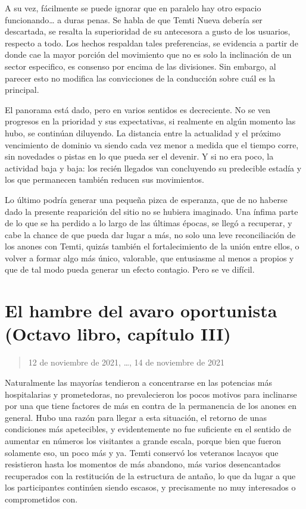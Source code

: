\documentclass[
]{book}
\begin{document}
A su vez, fácilmente se puede ignorar que en paralelo hay otro espacio funcionando\ldots{} a duras penas. Se habla de que Temti Nueva debería ser descartada, se resalta la superioridad de su antecesora a gusto de los usuarios, respecto a todo. Los hechos respaldan tales preferencias, se evidencia a partir de donde cae la mayor porción del movimiento que no es solo la inclinación de un sector especifico, es consenso por encima de las divisiones. Sin embargo, al parecer esto no modifica las convicciones de la conducción sobre cuál es la principal.

El panorama está dado, pero en varios sentidos es decreciente. No se ven progresos en la prioridad y sus expectativas, si realmente en algún momento las hubo, se continúan diluyendo. La distancia entre la actualidad y el próximo vencimiento de dominio va siendo cada vez menor a medida que el tiempo corre, sin novedades o pistas en lo que pueda ser el devenir. Y si no era poco, la actividad baja y baja: los recién llegados van concluyendo su predecible estadía y los que permanecen también reducen sus movimientos.

Lo último podría generar una pequeña pizca de esperanza, que de no haberse dado la presente reaparición del sitio no se hubiera imaginado. Una ínfima parte de lo que se ha perdido a lo largo de las últimas épocas, se llegó a recuperar, y cabe la chance de que pueda dar lugar a más, no solo una leve reconciliación de los anones con Temti, quizás también el fortalecimiento de la unión entre ellos, o volver a formar algo más único, valorable, que entusiasme al menos a propios y que de tal modo pueda generar un efecto contagio. Pero se ve difícil.

\hypertarget{el-hambre-del-avaro-oportunista-octavo-libro-capuxedtulo-iii}{%
\section{El hambre del avaro oportunista (Octavo libro, capítulo III)}\label{el-hambre-del-avaro-oportunista-octavo-libro-capuxedtulo-iii}}

\begin{quote}
12 de noviembre de 2021, \ldots, 14 de noviembre de 2021
\end{quote}

Naturalmente las mayorías tendieron a concentrarse en las potencias más hospitalarias y prometedoras, no prevalecieron los pocos motivos para inclinarse por una que tiene factores de más en contra de la permanencia de los anones en general. Hubo una razón para llegar a esta situación, el retorno de unas condiciones más apetecibles, y evidentemente no fue suficiente en el sentido de aumentar en números los visitantes a grande escala, porque bien que fueron solamente eso, un poco más y ya. Temti conservó los veteranos lacayos que resistieron hasta los momentos de más abandono, más varios desencantados recuperados con la restitución de la estructura de antaño, lo que da lugar a que los participantes continúen siendo escasos, y precisamente no muy interesados o comprometidos con.
\end{document}
